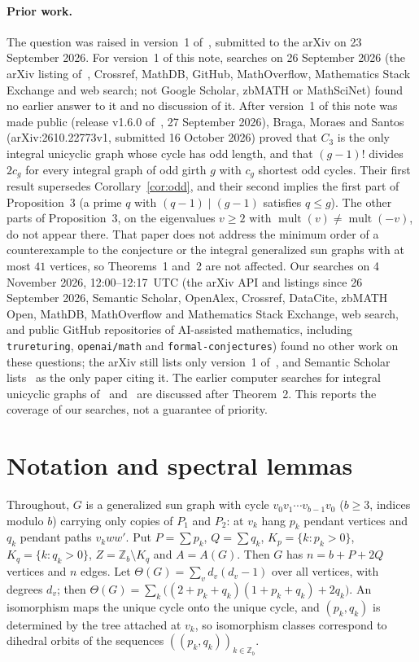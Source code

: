 \documentclass[11pt]{article}
\theoremstyle{definition}
\theoremstyle{remark}
\DeclareMathOperator{\mult}{mult}
\newcommand{\Z}{\mathbb Z}
\begin{document}
\paragraph{Prior work.}
The question was raised in version~1 of~\cite{bms}, submitted to the arXiv on
23 September 2026. For version~1 of this note, searches on 26 September 2026
(the arXiv listing of~\cite{bms}, Crossref, MathDB, GitHub, MathOverflow,
Mathematics Stack Exchange and web search; not Google Scholar, zbMATH or
MathSciNet) found no earlier answer to it and no discussion of it.
After version~1 of this note was made public (release v1.6.0 of~\cite{repo},
27 September 2026), Braga, Moraes and Santos~\cite{bms2} (arXiv:2610.22773v1,
submitted 16 October 2026) proved that $C_3$ is the only integral unicyclic
graph whose cycle has odd length, and that $(g-1)!$ divides $2c_g$ for every
integral graph of odd girth $g$ with $c_g$ shortest odd cycles. Their first
result supersedes Corollary~\ref{cor:odd}, and their second implies the first
part of Proposition~3 (a prime $q$ with $(q-1)\mid(g-1)$
satisfies $q\le g$). The other parts of Proposition~3, on the
eigenvalues $v\ge2$ with $\mult(v)\ne\mult(-v)$, do not appear there. That paper
does not address the minimum order of a counterexample to the conjecture or the
integral generalized sun graphs with at most $41$ vertices, so Theorems~1
and~2 are not affected. Our searches on 4 November 2026, 12:00--12:17~UTC (the
arXiv API and listings since 26 September 2026, Semantic Scholar, OpenAlex,
Crossref, DataCite, zbMATH Open, MathDB, MathOverflow and Mathematics Stack
Exchange, web search, and public GitHub repositories of AI-assisted
mathematics, including \texttt{trureturing}, \texttt{openai/math} and
\texttt{formal-conjectures}) found no other work on these questions; the arXiv
still lists only version~1 of~\cite{bms}, and Semantic Scholar lists~\cite{bms2}
as the only paper citing it.
The earlier computer searches for integral unicyclic graphs of~\cite{brt}
and~\cite{ver} are discussed after Theorem~2. This reports the coverage of
our searches, not a guarantee of priority.

\section{Notation and spectral lemmas}\label{sec:lemmas}

Throughout, $G$ is a generalized sun graph with cycle $v_0v_1\cdots v_{b-1}v_0$
($b\ge3$, indices modulo $b$) carrying only copies of $P_1$ and $P_2$: at $v_k$
hang $p_k$ pendant vertices and $q_k$ pendant paths $v_kww'$. Put
$P=\sum p_k$, $Q=\sum q_k$, $K_p=\{k:p_k>0\}$, $K_q=\{k:q_k>0\}$,
$Z=\Z_b\setminus K_q$ and $A=A(G)$. Then $G$ has $n=b+P+2Q$ vertices and $n$
edges. Let $\Theta(G)=\sum_vd_v(d_v-1)$ over all vertices, with degrees $d_v$;
then $\Theta(G)=\sum_k\bigl((2+p_k+q_k)(1+p_k+q_k)+2q_k\bigr)$. An isomorphism
maps the unique cycle onto the unique cycle, and $(p_k,q_k)$ is determined by
the tree attached at $v_k$, so isomorphism classes correspond to dihedral
orbits of the sequences $((p_k,q_k))_{k\in\Z_b}$.
\end{document}
